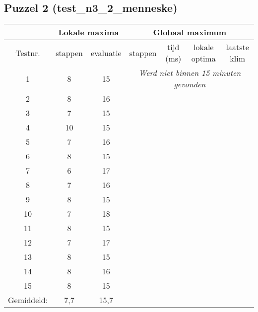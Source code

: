 \documentclass[]{report}
\begin{document}
\begin{appendices}
\subsection{Puzzel 2 (test\_n3\_2\_menneske)}
\begin{tabular}{|c||c|c||c|c|c|c|}
\hline  & \multicolumn{2}{|c||}{Lokale maxima} & \multicolumn{4}{|c|}{Globaal maximum}  \\ 
\hline Testnr. & stappen & evaluatie & stappen & tijd (ms) & lokale optima & laatste klim \\ 
\hline \hline	1	&	8	&	15	&	\multicolumn{4}{|c|}{\textit{Werd niet binnen 15 minuten gevonden}}\\
\hline	2	&	8	&	16	&		&		&		& \\
\hline	3	&	7	&	15	&		&		&		& \\
\hline	4	&	10	&	15	&		&		&		& \\
\hline	5	&	7	&	16	&		&		&		& \\
\hline	6	&	8	&	15	&		&		&		& \\
\hline	7	&	6	&	17	&		&		&		& \\
\hline	8	&	7	&	16	&		&		&		& \\
\hline	9	&	8	&	15	&		&		&		& \\
\hline	10	&	7	&	18	&		&		&		& \\
\hline	11	&	8	&	15	&		&		&		& \\
\hline	12	&	7	&	17	&		&		&		& \\
\hline	13	&	8	&	15	&		&		&		& \\
\hline	14	&	8	&	16	&		&		&		& \\
\hline	15	&	8	&	15	&		&		&		& \\

\hline \hline Gemiddeld: & 7,7 & 15,7 &  &  &  &  \\ 
\hline 
\end{tabular}

\end{appendices}
\end{document}
